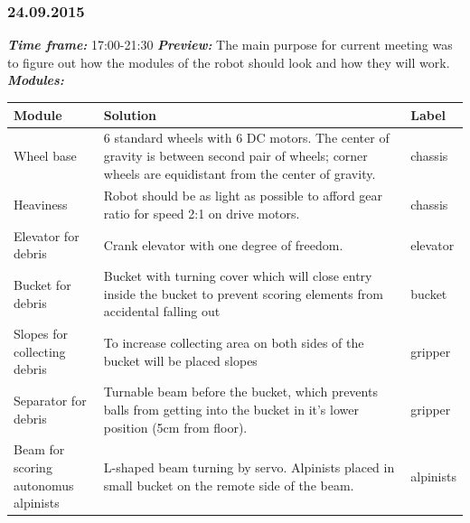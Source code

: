 \subsubsection{24.09.2015}
	\textit{\textbf{Time frame:}} 17:00-21:30 \newline
	\textit{\textbf{Preview:}} The main purpose for current meeting was to figure out how the modules of the robot should look and how they will work. \newline \newline
	\textit{\textbf{Modules:}}

  \begin{table}[H]
	\vspace{-2mm}
	\begin{center}
		\begin{tabular}{|p{0.2\linewidth}|p{0.7\linewidth}|p{0.1\linewidth}|}
			\hline
			Module & Solution & Label \\
			\hline
			Wheel base & 6 standard wheels with 6 DC motors. The center of gravity is between second pair of wheels; corner wheels are equidistant from the center of gravity. & chassis \\
			\hline
			Heaviness & Robot should be as light as possible to afford gear ratio for speed 2:1 on drive motors. & chassis \\
			\hline
			Elevator for debris & Crank elevator with one degree of freedom. & elevator \\
			\hline
			Bucket for debris & Bucket with turning cover which will close entry inside the bucket to prevent scoring elements from accidental falling out & bucket \\
			\hline
			Slopes for collecting debris & To increase collecting area on both sides of the bucket will be placed slopes & gripper \\
			\hline
			Separator for debris & Turnable beam before the bucket, which prevents balls from getting into the bucket in it's lower position (5cm from floor). & gripper \\
			\hline
			Beam for scoring autonomus alpinists & L-shaped beam turning by servo. Alpinists placed in small bucket on the remote side of the beam. & alpinists \\
			\hline
		\end{tabular}
	\end{center}
  \end{table}
  
